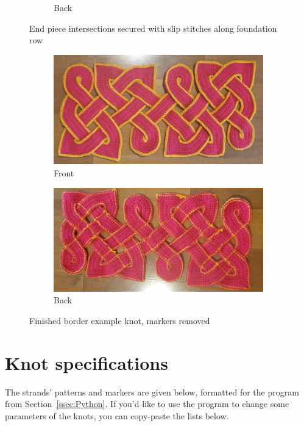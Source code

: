 \documentclass[openany]{book}
\newcommand{\bk}{border example knot}
\begin{document}
\begin{figure}[H]
\begin{subfigure}[t]{.45\textwidth}
\caption{Back }
\end{subfigure}
\caption{End piece intersections secured with slip stitches along foundation row}
\end{figure}


\begin{figure}[H]\centering
\begin{subfigure}[t]{.45\textwidth}\centering
\includegraphics[width=.95\textwidth]{bk/done3}
\caption{Front}
\end{subfigure}
%
\begin{subfigure}[t]{.45\textwidth}
		\centering
		\includegraphics[width=.95\textwidth]{bk/done4}
\caption{Back}
\end{subfigure}
\caption{Finished \bk, markers removed}
\end{figure}

\section{Knot specifications}
The strands' patterns and markers are given below, formatted for the program from Section~\ref{ssec:Python}. If you'd like to use the program to change some parameters of the knots, you can copy-paste the lists below.
\end{document}
